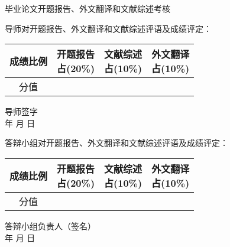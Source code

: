 \thispagestyle{empty}
{
\begin{center}
\stfangsong\sanhao 毕业论文开题报告、外文翻译和文献综述考核
\end{center}
{\songti\sihao 导师对开题报告、外文翻译和文献综述评语及成绩评定：}
\vspace{4cm}

{
\hspace{3cm} \songti\xiaosi
\begin{tabular}{|c|c|c|c|}
    \hline
    成绩比例 
    & \tabincell{c}{开题报告\\占(20\%)}
	& \tabincell{c}{文献综述\\占(10\%)}
	& \tabincell{c}{外文翻译\\占(10\%)} \\

    \hline
    分值   & & &  \\
    \hline
\end{tabular}
}
\begin{flushright}
    导师签字\;\underline{\hspace{4em}}\\
    年 \quad 月 \quad 日
\end{flushright}
{\songti\sihao 答辩小组对开题报告、外文翻译和文献综述评语及成绩评定：}
\vspace{4cm}

{
\hspace{3cm} \songti\xiaosi
\begin{tabular}{|c|c|c|c|}
    \hline
    成绩比例 
    & \tabincell{c}{开题报告\\占(20\%)}
	& \tabincell{c}{文献综述\\占(10\%)}
	& \tabincell{c}{外文翻译\\占(10\%)} \\

    \hline
    分值   & & &  \\
    \hline
\end{tabular}
}
\begin{flushright}
    答辩小组负责人（签名）\;\underline{\hspace{4em}}\\
    年 \quad 月 \quad 日
\end{flushright}
}

